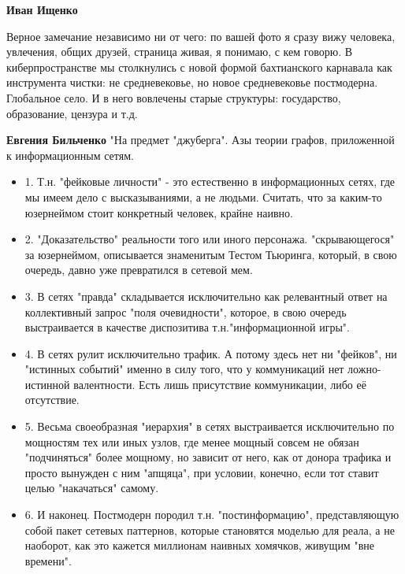\begin{itemize}
\begin{itemize}
\textbf{Иван Ищенко} 

Верное замечание независимо ни от чего: по вашей фото я сразу вижу человека,
увлечения, общих друзей, страница живая, я понимаю, с кем говорю. В
киберпространстве мы столкнулись с новой формой бахтианского карнавала как
инструмента чистки: не средневековье, но новое средневековье постмодерна.
Глобальное село. И в него вовлечены старые структуры: государство, образование,
цензура и т.д.


 
\textbf{Евгения Бильченко} "На предмет "джуберга". Азы теории графов, приложенной к информационным сетям.

\begin{itemize}
\item 1. Т.н. "фейковые личности" - это естественно в информационных сетях, где мы
имеем дело с высказываниями, а не людьми. Считать, что за каким-то юзернеймом
стоит конкретный человек, крайне наивно.

\item 2. "Доказательство" реальности того или иного персонажа. "скрывающегося" за
юзернеймом, описывается знаменитым Тестом Тьюринга, который, в свою очередь,
давно уже превратился в сетевой мем.

\item 3. В сетях "правда" складывается исключительно как релевантный ответ на
коллективный запрос "поля очевидности", которое, в свою очередь выстраивается в
качестве диспозитива т.н."информационной игры".

\item 4. В сетях рулит исключительно трафик. А потому здесь нет ни "фейков", ни
"истинных событий" именно в силу того, что у коммуникаций нет ложно-истинной
валентности. Есть лишь присутствие коммуникации, либо её отсутствие.

\item 5. Весьма своеобразная "иерархия" в сетях выстраивается исключительно по
мощностям тех или иных узлов, где менее мощный совсем не обязан "подчиняться"
более мощному, но зависит от него, как от донора трафика и просто вынужден с
ним "апщяца", при условии, конечно, если тот ставит целью "накачаться" самому.

\item 6. И наконец. Постмодерн породил т.н. "постинформацию", представляющую собой
пакет сетевых паттернов, которые становятся моделью для реала, а не наоборот,
как это кажется миллионам наивных хомячков, живущим "вне времени".


\end{itemize}
\end{itemize}
\end{itemize}
